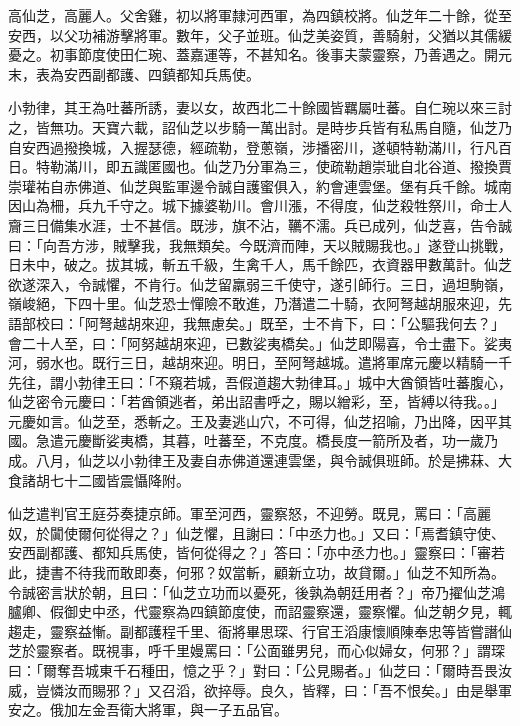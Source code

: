 \begin{pinyinscope}
 高仙芝，高麗人。父舍雞，初以將軍隸河西軍，為四鎮校將。仙芝年二十餘，從至安西，以父功補游擊將軍。數年，父子並班。仙芝美姿質，善騎射，父猶以其儒緩憂之。初事節度使田仁琬、蓋嘉運等，不甚知名。後事夫蒙靈察，乃善遇之。開元末，表為安西副都護、四鎮都知兵馬使。



 小勃律，其王為吐蕃所誘，妻以女，故西北二十餘國皆羈屬吐蕃。自仁琬以來三討之，皆無功。天寶六載，詔仙芝以步騎一萬出討。是時步兵皆有私馬自隨，仙芝乃自安西過撥換城，入握瑟德，經疏勒，登蔥嶺，涉播密川，遂頓特勒滿川，行凡百日。特勒滿川，即五識匿國也。仙芝乃分軍為三，使疏勒趙崇玼自北谷道、撥換賈崇瓘祐自赤佛道、仙芝與監軍邊令誠自護蜜俱入，約會連雲堡。堡有兵千餘。城南因山為柵，兵九千守之。城下據婆勒川。會川漲，不得度，仙芝殺牲祭川，命士人齎三日備集水涯，士不甚信。既涉，旗不沾，韉不濡。兵已成列，仙芝喜，告令誠曰：「向吾方涉，賊擊我，我無類矣。今既濟而陣，天以賊賜我也。」遂登山挑戰，日未中，破之。拔其城，斬五千級，生禽千人，馬千餘匹，衣資器甲數萬計。仙芝欲遂深入，令誠懼，不肯行。仙芝留羸弱三千使守，遂引師行。三日，過坦駒嶺，嶺峻絕，下四十里。仙芝恐士憚險不敢進，乃潛遣二十騎，衣阿弩越胡服來迎，先語部校曰：「阿弩越胡來迎，我無慮矣。」既至，士不肯下，曰：「公驅我何去？」會二十人至，曰：「阿努越胡來迎，已數娑夷橋矣。」仙芝即陽喜，令士盡下。娑夷河，弱水也。既行三日，越胡來迎。明日，至阿弩越城。遣將軍席元慶以精騎一千先往，謂小勃律王曰：「不窺若城，吾假道趨大勃律耳。」城中大酋領皆吐蕃腹心，仙芝密令元慶曰：「若酋領逃者，弟出詔書呼之，賜以繒彩，至，皆縛以待我。。」元慶如言。仙芝至，悉斬之。王及妻逃山穴，不可得，仙芝招喻，乃出降，因平其國。急遣元慶斷娑夷橋，其暮，吐蕃至，不克度。橋長度一箭所及者，功一歲乃成。八月，仙芝以小勃律王及妻自赤佛道還連雲堡，與令誠俱班師。於是拂菻、大食諸胡七十二國皆震懾降附。



 仙芝遣判官王庭芬奏捷京師。軍至河西，靈察怒，不迎勞。既見，罵曰：「高麗奴，於闐使爾何從得之？」仙芝懼，且謝曰：「中丞力也。」又曰：「焉耆鎮守使、安西副都護、都知兵馬使，皆何從得之？」答曰：「亦中丞力也。」靈察曰：「審若此，捷書不待我而敢即奏，何邪？奴當斬，顧新立功，故貸爾。」仙芝不知所為。令誠密言狀於朝，且曰：「仙芝立功而以憂死，後孰為朝廷用者？」帝乃擢仙芝鴻臚卿、假御史中丞，代靈察為四鎮節度使，而詔靈察還，靈察懼。仙芝朝夕見，輒趨走，靈察益慚。副都護程千里、衙將畢思琛、行官王滔康懷順陳奉忠等皆嘗譖仙芝於靈察者。既視事，呼千里嫚罵曰：「公面雖男兒，而心似婦女，何邪？」謂琛曰：「爾奪吾城東千石種田，憶之乎？」對曰：「公見賜者。」仙芝曰：「爾時吾畏汝威，豈憐汝而賜邪？」又召滔，欲捽辱。良久，皆釋，曰：「吾不恨矣。」由是舉軍安之。俄加左金吾衛大將軍，與一子五品官。




\end{pinyinscope}
